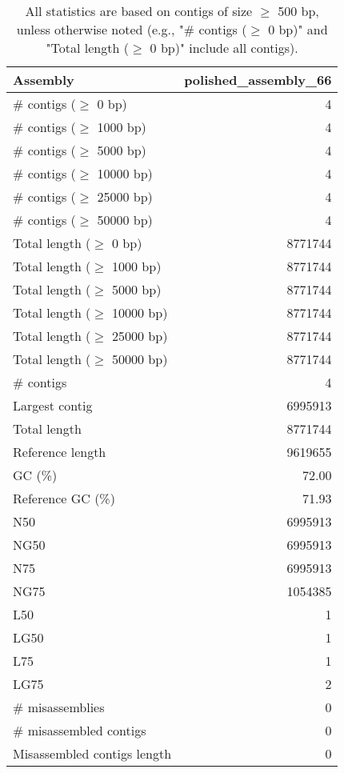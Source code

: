 \documentclass[12pt,a4paper]{article}
\begin{document}
\begin{table}[ht]
\begin{center}
\caption{All statistics are based on contigs of size $\geq$ 500 bp, unless otherwise noted (e.g., "\# contigs ($\geq$ 0 bp)" and "Total length ($\geq$ 0 bp)" include all contigs).}
\begin{tabular}{|l*{1}{|r}|}
\hline
Assembly & polished\_assembly\_66 \\ \hline
\# contigs ($\geq$ 0 bp) & 4 \\ \hline
\# contigs ($\geq$ 1000 bp) & 4 \\ \hline
\# contigs ($\geq$ 5000 bp) & 4 \\ \hline
\# contigs ($\geq$ 10000 bp) & 4 \\ \hline
\# contigs ($\geq$ 25000 bp) & 4 \\ \hline
\# contigs ($\geq$ 50000 bp) & 4 \\ \hline
Total length ($\geq$ 0 bp) & 8771744 \\ \hline
Total length ($\geq$ 1000 bp) & 8771744 \\ \hline
Total length ($\geq$ 5000 bp) & 8771744 \\ \hline
Total length ($\geq$ 10000 bp) & 8771744 \\ \hline
Total length ($\geq$ 25000 bp) & 8771744 \\ \hline
Total length ($\geq$ 50000 bp) & 8771744 \\ \hline
\# contigs & 4 \\ \hline
Largest contig & 6995913 \\ \hline
Total length & 8771744 \\ \hline
Reference length & 9619655 \\ \hline
GC (\%) & 72.00 \\ \hline
Reference GC (\%) & 71.93 \\ \hline
N50 & 6995913 \\ \hline
NG50 & 6995913 \\ \hline
N75 & 6995913 \\ \hline
NG75 & 1054385 \\ \hline
L50 & 1 \\ \hline
LG50 & 1 \\ \hline
L75 & 1 \\ \hline
LG75 & 2 \\ \hline
\# misassemblies & 0 \\ \hline
\# misassembled contigs & 0 \\ \hline
Misassembled contigs length & 0 \\ \hline

\end{tabular}
\end{center}
\end{table}
\end{document}
